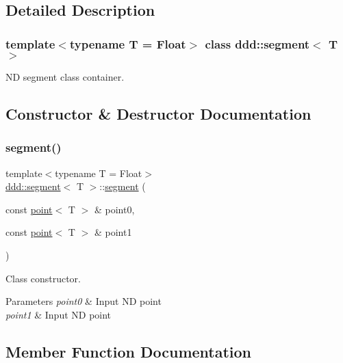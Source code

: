 \subsection{Detailed Description}
\subsubsection*{template$<$typename T = Float$>$\newline
class ddd\+::segment$<$ T $>$}

ND segment class container. 

\subsection{Constructor \& Destructor Documentation}
\mbox{\label{classddd_1_1segment_afdfcc983efc30b3dee0af2603795775b}} 
\subsubsection{\texorpdfstring{segment()}{segment()}}
{\footnotesize\ttfamily template$<$typename T = Float$>$ \\
\hyperlink{classddd_1_1segment}{ddd\+::segment}$<$ T $>$\+::\hyperlink{classddd_1_1segment}{segment} (\begin{DoxyParamCaption}\item[{const \hyperlink{classddd_1_1point}{point}$<$ T $>$ \&}]{point0,  }\item[{const \hyperlink{classddd_1_1point}{point}$<$ T $>$ \&}]{point1 }\end{DoxyParamCaption})\hspace{0.3cm}{\ttfamily [inline]}}



Class constructor. 


\begin{DoxyParams}{Parameters}
{\em point0} & Input ND point \\
\hline
{\em point1} & Input ND point \\
\hline
\end{DoxyParams}


\subsection{Member Function Documentation}
\mbox{\label{classddd_1_1segment_a9c33e619d61ee3fc61a7767ebc2948f5}} 
